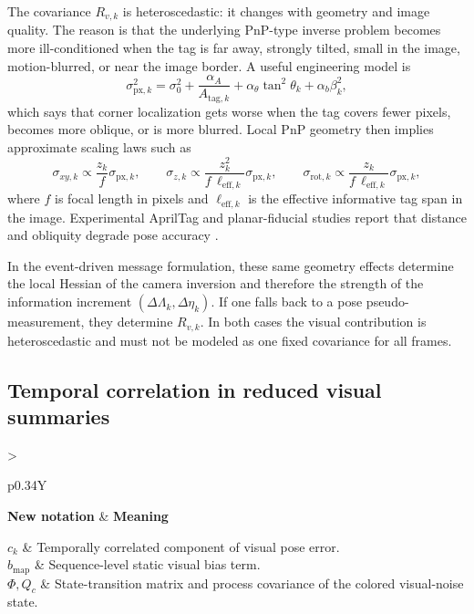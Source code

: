 \documentclass[11pt]{report}
\newcommand{\NotationTable}[1]{%
\vspace{0.6mm}
{\scriptsize
\setlength{\tabcolsep}{2.5pt}
\begin{tabularx}{\columnwidth}{>{\raggedright\arraybackslash}p{0.34\columnwidth}Y}
\toprule
\textbf{New notation} & \textbf{Meaning}\\
\midrule
#1\\
\bottomrule
\end{tabularx}}
\vspace{0.8mm}}
\begin{document}
The covariance $R_{v,k}$ is heteroscedastic: it changes with geometry and image quality. The reason is that the underlying PnP-type inverse problem becomes more ill-conditioned when the tag is far away, strongly tilted, small in the image, motion-blurred, or near the image border. A useful engineering model is
\begin{equation}
\sigma_{\mathrm{px},k}^2=\sigma_0^2+\frac{\alpha_A}{A_{\mathrm{tag},k}}+\alpha_\theta\tan^2\theta_k+\alpha_b\beta_k^2,
\label{eq:pixel_sigma_model_sweep}
\end{equation}
which says that corner localization gets worse when the tag covers fewer pixels, becomes more oblique, or is more blurred. Local PnP geometry then implies approximate scaling laws such as
\begin{equation}
\sigma_{xy,k}\propto \frac{z_k}{f}\sigma_{\mathrm{px},k},
\qquad
\sigma_{z,k}\propto \frac{z_k^2}{f\,\ell_{\mathrm{eff},k}}\sigma_{\mathrm{px},k},
\qquad
\sigma_{\mathrm{rot},k}\propto \frac{z_k}{f\,\ell_{\mathrm{eff},k}}\sigma_{\mathrm{px},k},
\end{equation}
where $f$ is focal length in pixels and $\ell_{\mathrm{eff},k}$ is the effective informative tag span in the image. Experimental AprilTag and planar-fiducial studies report that distance and obliquity degrade pose accuracy \citep{olson2011apriltag,abbas2019apriltag,adamek2023variance}.

In the event-driven message formulation, these same geometry effects determine the local Hessian of the camera inversion and therefore the strength of the information increment $(\Delta\Lambda_k,\Delta\eta_k)$. If one falls back to a pose pseudo-measurement, they determine $R_{v,k}$. In both cases the visual contribution is heteroscedastic and must not be modeled as one fixed covariance for all frames.

\subsection{Temporal correlation in reduced visual summaries}
\NotationTable{
$c_k$ & Temporally correlated component of visual pose error.\\
$b_{\mathrm{map}}$ & Sequence-level static visual bias term.\\
$\Phi,Q_c$ & State-transition matrix and process covariance of the colored visual-noise state.}
\end{document}
